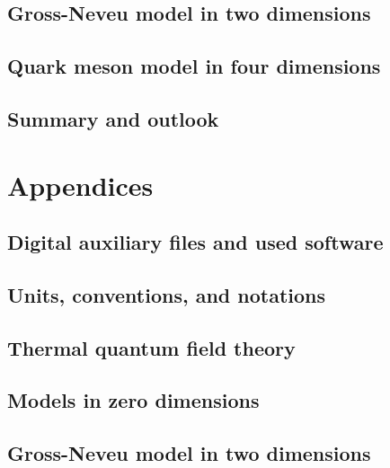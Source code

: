 \chapter{Gross-Neveu model in two dimensions}\label{chap:GN}








\chapter{Quark meson model in four dimensions}\label{chap:QMM}


\chapter{Summary and outlook}\label{chap:conclusion}


\part*{Appendices}\label{app:app}
\appendix
\chapter{Digital auxiliary files and used software}



\chapter{Units, conventions, and notations}\label{app:conventions}%


\chapter{Thermal quantum field theory}\label{app:thermalQFT}


\chapter{Models in zero dimensions}\label{app:zerod}


\chapter{Gross-Neveu model in two dimensions}\label{app:gn}
